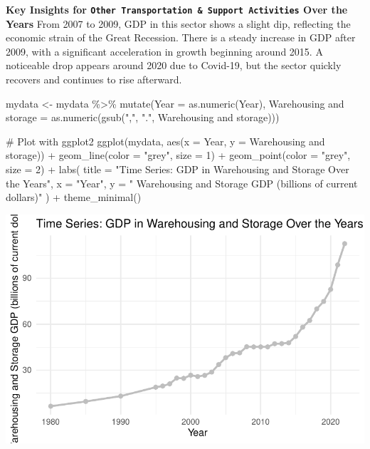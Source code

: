 \documentclass[
  letterpaper,
  DIV=11,
  numbers=noendperiod]{scrreprt}
\newenvironment{Shaded}{\begin{snugshade}}{\end{snugshade}}
\newcommand{\AttributeTok}[1]{\textcolor[rgb]{0.40,0.45,0.13}{#1}}
\newcommand{\CommentTok}[1]{\textcolor[rgb]{0.37,0.37,0.37}{#1}}
\newcommand{\DecValTok}[1]{\textcolor[rgb]{0.68,0.00,0.00}{#1}}
\newcommand{\FunctionTok}[1]{\textcolor[rgb]{0.28,0.35,0.67}{#1}}
\newcommand{\NormalTok}[1]{\textcolor[rgb]{0.00,0.23,0.31}{#1}}
\newcommand{\OtherTok}[1]{\textcolor[rgb]{0.00,0.23,0.31}{#1}}
\newcommand{\SpecialCharTok}[1]{\textcolor[rgb]{0.37,0.37,0.37}{#1}}
\newcommand{\StringTok}[1]{\textcolor[rgb]{0.13,0.47,0.30}{#1}}
\begin{document}
\textbf{Key Insights for
\texttt{Other\ Transportation\ \&\ Support\ Activities} Over the Years}
From 2007 to 2009, GDP in this sector shows a slight dip, reflecting the
economic strain of the Great Recession. There is a steady increase in
GDP after 2009, with a significant acceleration in growth beginning
around 2015. A noticeable drop appears around 2020 due to Covid-19, but
the sector quickly recovers and continues to rise afterward.

\begin{Shaded}
\begin{Highlighting}[]
\NormalTok{mydata }\OtherTok{\textless{}{-}}\NormalTok{ mydata }\SpecialCharTok{\%\textgreater{}\%}
  \FunctionTok{mutate}\NormalTok{(}\AttributeTok{Year =} \FunctionTok{as.numeric}\NormalTok{(Year),}
         \StringTok{\textasciigrave{}}\AttributeTok{Warehousing and storage}\StringTok{\textasciigrave{}} \OtherTok{=} \FunctionTok{as.numeric}\NormalTok{(}\FunctionTok{gsub}\NormalTok{(}\StringTok{","}\NormalTok{, }\StringTok{"."}\NormalTok{, }\StringTok{\textasciigrave{}}\AttributeTok{Warehousing and storage}\StringTok{\textasciigrave{}}\NormalTok{)))}

\CommentTok{\# Plot with ggplot2}
\FunctionTok{ggplot}\NormalTok{(mydata, }\FunctionTok{aes}\NormalTok{(}\AttributeTok{x =}\NormalTok{ Year, }\AttributeTok{y =} \StringTok{\textasciigrave{}}\AttributeTok{Warehousing and storage}\StringTok{\textasciigrave{}}\NormalTok{)) }\SpecialCharTok{+}
  \FunctionTok{geom\_line}\NormalTok{(}\AttributeTok{color =} \StringTok{"grey"}\NormalTok{, }\AttributeTok{size =} \DecValTok{1}\NormalTok{) }\SpecialCharTok{+}
  \FunctionTok{geom\_point}\NormalTok{(}\AttributeTok{color =} \StringTok{"grey"}\NormalTok{, }\AttributeTok{size =} \DecValTok{2}\NormalTok{) }\SpecialCharTok{+}
  \FunctionTok{labs}\NormalTok{(}
    \AttributeTok{title =} \StringTok{"Time Series: GDP in Warehousing and Storage Over the Years"}\NormalTok{,}
    \AttributeTok{x =} \StringTok{"Year"}\NormalTok{,}
    \AttributeTok{y =} \StringTok{" Warehousing and Storage GDP (billions of current dollars)"}
\NormalTok{  ) }\SpecialCharTok{+}
  \FunctionTok{theme\_minimal}\NormalTok{()}
\end{Highlighting}
\end{Shaded}

\includegraphics{FinalProject_Abigail_files/figure-pdf/unnamed-chunk-9-1.pdf}
\end{document}
